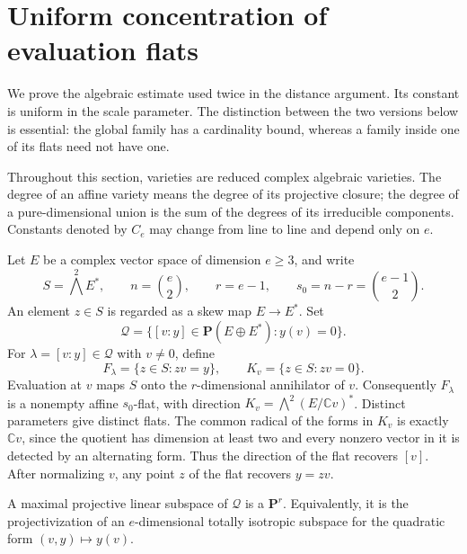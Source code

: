 \section{Uniform concentration of evaluation flats}
\label{sec:evaluation-flat-concentration}

We prove the algebraic estimate used twice in the distance argument.  Its constant is uniform in the scale parameter.  The distinction between the two versions below is essential: the global family has a cardinality bound, whereas a family inside one of its flats need not have one.

Throughout this section, varieties are reduced complex algebraic varieties.  The degree of an affine variety means the degree of its projective closure; the degree of a pure-dimensional union is the sum of the degrees of its irreducible components.  Constants denoted by $C_e$ may change from line to line and depend only on $e$.

Let $E$ be a complex vector space of dimension $e\geq3$, and write
\[
 S=\bigwedge^2E^*,\qquad n=\binom e2,\qquad
 r=e-1,\qquad s_0=n-r=\binom{e-1}{2}.
\]
An element $z\in S$ is regarded as a skew map $E\to E^*$.  Set
\[
 \mathcal{Q}=\{[v:y]\in\mathbf{P}(E\oplus E^*):y(v)=0\}.
\]
For $\lambda=[v:y]\in\mathcal{Q}$ with $v\ne0$, define
\begin{equation}
 F_\lambda=\{z\in S:zv=y\},\qquad
 K_v=\{z\in S:zv=0\}.
 \label{eq:conc-flat-model}
\end{equation}
Evaluation at $v$ maps $S$ onto the $r$-dimensional annihilator of $v$. Consequently $F_\lambda$ is a nonempty affine $s_0$-flat, with direction $K_v=\bigwedge^2(E/\mathbb{C}v)^*$.  Distinct parameters give distinct flats.  The common radical of the forms in $K_v$ is exactly $\mathbb{C}v$, since the quotient has dimension at least two and every nonzero vector in it is detected by an alternating form. Thus the direction of the flat recovers $[v]$. After normalizing $v$, any point $z$ of the flat recovers $y=zv$.

A maximal projective linear subspace of $\mathcal{Q}$ is a $\mathbf{P}^r$.  Equivalently, it is the projectivization of an $e$-dimensional totally isotropic subspace for the quadratic form $(v,y)\mapsto y(v)$.

